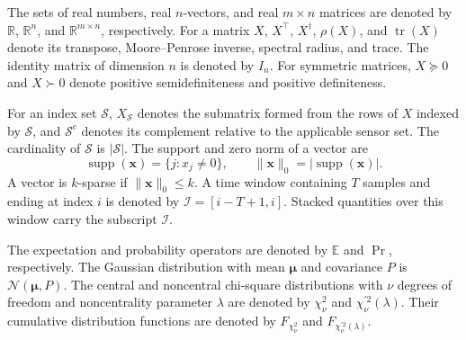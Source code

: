 The sets of real numbers, real $n$-vectors, and real $m\times n$ matrices are denoted by $\mathbb{R}$, $\mathbb{R}^n$, and $\mathbb{R}^{m\times n}$, respectively. For a matrix $X$, $X^\top$, $X^\dagger$, $\rho(X)$, and $\operatorname{tr}(X)$ denote its transpose, Moore--Penrose inverse, spectral radius, and trace. The identity matrix of dimension $n$ is denoted by $I_n$. For symmetric matrices, $X\succeq0$ and $X\succ0$ denote positive semidefiniteness and positive definiteness.

For an index set $\mathcal S$, $X_{\mathcal S}$ denotes the submatrix formed from the rows of $X$ indexed by $\mathcal S$, and $\mathcal S^c$ denotes its complement relative to the applicable sensor set. The cardinality of $\mathcal S$ is $|\mathcal S|$. The support and zero norm of a vector are
\[
\operatorname{supp}(\mathbf{x})=\{j:x_j\neq0\},
\qquad
\|\mathbf{x}\|_0=|\operatorname{supp}(\mathbf{x})|.
\]
A vector is $k$-sparse if $\|\mathbf{x}\|_0\le k$. A time window containing $T$ samples and ending at index $i$ is denoted by $\mathcal I=[i-T+1,i]$. Stacked quantities over this window carry the subscript $\mathcal I$.

The expectation and probability operators are denoted by $\mathbb{E}$ and $\Pr$, respectively. The Gaussian distribution with mean $\boldsymbol{\mu}$ and covariance $P$ is $\mathcal{N}(\boldsymbol{\mu},P)$. The central and noncentral chi-square distributions with $\nu$ degrees of freedom and noncentrality parameter $\lambda$ are denoted by $\chi_\nu^2$ and $\chi_\nu^{\prime2}(\lambda)$. Their cumulative distribution functions are denoted by $F_{\chi_\nu^2}$ and $F_{\chi_\nu^{\prime2}(\lambda)}$.
